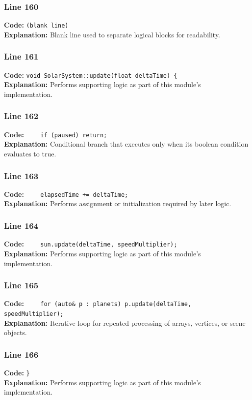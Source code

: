 \documentclass[11pt,a4paper]{article}
\begin{document}
\subsubsection*{Line 160}
\textbf{Code:} \texttt{(blank line)}\\
\textbf{Explanation:} Blank line used to separate logical blocks for readability.

\subsubsection*{Line 161}
\textbf{Code:} \verb|void SolarSystem::update(float deltaTime) {|\\
\textbf{Explanation:} Performs supporting logic as part of this module's implementation.

\subsubsection*{Line 162}
\textbf{Code:} \verb|    if (paused) return;|\\
\textbf{Explanation:} Conditional branch that executes only when its boolean condition evaluates to true.

\subsubsection*{Line 163}
\textbf{Code:} \verb|    elapsedTime += deltaTime;|\\
\textbf{Explanation:} Performs assignment or initialization required by later logic.

\subsubsection*{Line 164}
\textbf{Code:} \verb|    sun.update(deltaTime, speedMultiplier);|\\
\textbf{Explanation:} Performs supporting logic as part of this module's implementation.

\subsubsection*{Line 165}
\textbf{Code:} \verb|    for (auto& p : planets) p.update(deltaTime, speedMultiplier);|\\
\textbf{Explanation:} Iterative loop for repeated processing of arrays, vertices, or scene objects.

\subsubsection*{Line 166}
\textbf{Code:} \verb|}|\\
\textbf{Explanation:} Performs supporting logic as part of this module's implementation.
\end{document}
